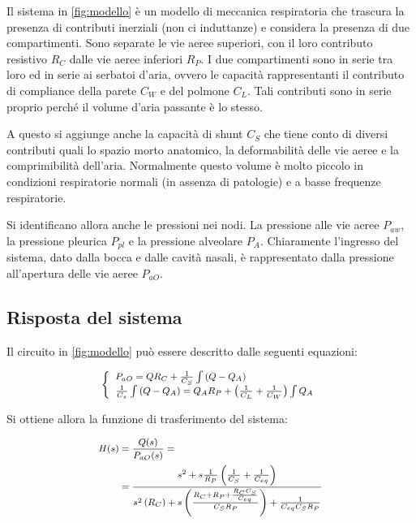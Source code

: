 Il sistema in \cref{fig:modello} è un modello di meccanica respiratoria che trascura la presenza di contributi inerziali (non ci induttanze) e considera la presenza di due compartimenti. Sono separate le vie aeree superiori, con il loro contributo resistivo $R_C$ dalle vie aeree inferiori $R_P$. I due compartimenti sono in serie tra loro ed in serie ai serbatoi d'aria, ovvero le capacità rappresentanti il contributo di compliance della parete $C_W$ e del polmone $C_L$. 
Tali contributi sono in serie proprio perché il volume d'aria passante è lo stesso. 

A questo si aggiunge anche la capacità di shunt $C_S$ che tiene conto di diversi contributi quali lo spazio morto anatomico, la deformabilità delle vie aeree e la comprimibilità dell'aria. Normalmente questo volume è molto piccolo in condizioni respiratorie normali (in assenza di patologie) e a basse frequenze respiratorie.

Si identificano allora anche le pressioni nei nodi. La pressione alle vie aeree $P_{aw}$, la pressione pleurica $P_{pl}$ e la pressione alveolare $P_A$. Chiaramente l'ingresso del sistema, dato dalla bocca e dalle cavità nasali, è rappresentato dalla pressione all'apertura delle vie aeree $P_{aO}$. 



\subsection{Risposta del sistema}

Il circuito in \cref{fig:modello} può essere descritto dalle seguenti equazioni:

\begin{equation}
	\footnotesize{
	\left\{\begin{array}{l}
		P_{a O}=Q R_{C}+\frac{1}{C_{S}} \int\left(Q-Q_{A}\right) \\
		\frac{1}{C_{s}} \int\left(Q-Q_{A}\right)=Q_{A} R_{P}+\left(\frac{1}{C_{L}}+\frac{1}{C_{W}}\right) \int Q_{A}
	\end{array}\right.}
\label{eq:modello}
\end{equation}

Si ottiene allora la funzione di trasferimento del sistema:

\begin{equation}
		\footnotesize{
\begin{aligned}
	H(s)&=\frac{Q(s)}{P_{a O}(s)}=\\
	&=\frac{s^{2}+s \frac{1}{R_{P}}\left(\frac{1}{C_{S}}+\frac{1}{C_{e q}}\right)}{s^{2}\left(R_{C}\right)+s\left(\frac{R_{C}+R_{P}+\frac{R_{C} C_{S}}{C_{e q}}}{C_{S} R_{P}}\right)+\frac{1}{C_{e q} C_{S} R_{P}}}
\end{aligned}}
\label{eq:fdt}
\end{equation}

